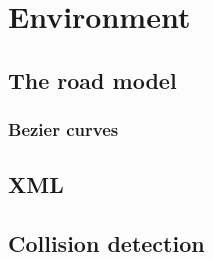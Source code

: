 

\section{Environment}

\subsection{The road model}
\label{sec:roadModel}


\subsubsection{Bezier curves}


\subsection{XML}
\label{sec:XML}


\subsection{Collision detection}
